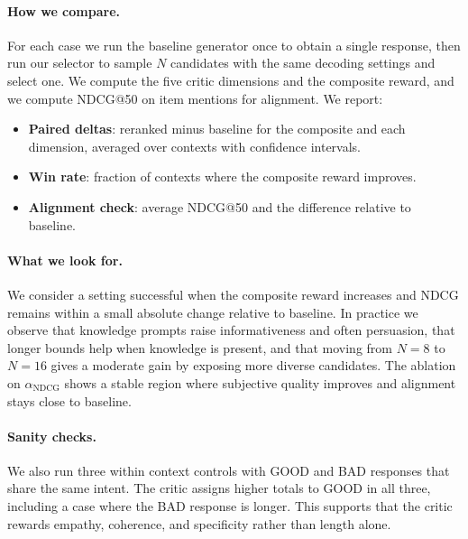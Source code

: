 \documentclass[12pt]{article}
\begin{document}
  \paragraph{How we compare.} For each case we run the baseline generator once to obtain a single response, then run our selector to sample $N$ candidates with the same decoding settings and select one. We compute the five critic dimensions and the composite reward, and we compute NDCG@50 on item mentions for alignment. We report:
  \begin{itemize}[leftmargin=*]
    \item \textbf{Paired deltas}: reranked minus baseline for the composite and each dimension, averaged over contexts with confidence intervals.
    \item \textbf{Win rate}: fraction of contexts where the composite reward improves.
    \item \textbf{Alignment check}: average NDCG@50 and the difference relative to baseline.
  \end{itemize}
  
  \paragraph{What we look for.} We consider a setting successful when the composite reward increases and NDCG remains within a small absolute change relative to baseline. In practice we observe that knowledge prompts raise informativeness and often persuasion, that longer bounds help when knowledge is present, and that moving from $N=8$ to $N=16$ gives a moderate gain by exposing more diverse candidates. The ablation on $\alpha_{\mathrm{NDCG}}$ shows a stable region where subjective quality improves and alignment stays close to baseline.
  
  \paragraph{Sanity checks.} We also run three within context controls with GOOD and BAD responses that share the same intent. The critic assigns higher totals to GOOD in all three, including a case where the BAD response is longer. This supports that the critic rewards empathy, coherence, and specificity rather than length alone.
  
\end{document}
